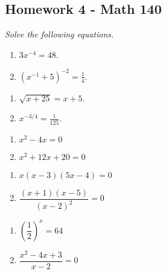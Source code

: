 \documentclass[10pt]{article}
\newcommand{\ds}{\displaystyle}
\begin{document}
\pagestyle{empty}
\subsection*{Homework 4 - Math 140}

\noindent 
\textit{Solve the following equations. }

\begin{multicols}{2}
\begin{enumerate}
\item $\ds 3 x^{-4} = 48$. 
\item $(x^{-1} + 5)^{-2} = \frac{1}{4}$. 
\setcounter{enumCount}{\theenumi}
\end{enumerate}
\end{multicols}
\vfill

\begin{multicols}{2}
\begin{enumerate}
\setcounter{enumi}{\theenumCount}
\item $\sqrt{x + 25} = x + 5$. 
\item $x^{-3/4} = \frac{1}{125}$. 
\setcounter{enumCount}{\theenumi}
\end{enumerate}
\end{multicols}
\vfill

\begin{multicols}{2}
\begin{enumerate}
\setcounter{enumi}{\theenumCount}
\item $x^2 - 4x = 0$ 
\item $x^2 + 12x + 20 = 0$
\setcounter{enumCount}{\theenumi}
\end{enumerate}
\end{multicols}
\vfill


\begin{multicols}{2}
\begin{enumerate}
\setcounter{enumi}{\theenumCount}
\item $x(x - 3)(5x-4) = 0$ 
\item $\dfrac{(x+1)(x-5)}{(x-2)^2} = 0$
\setcounter{enumCount}{\theenumi}
\end{enumerate}
\end{multicols}
\vfill


\begin{multicols}{2}
\begin{enumerate}
\setcounter{enumi}{\theenumCount}
\item $\left(\dfrac{1}{2} \right)^x = 64$ 
\item $\dfrac{x^2-4x+3}{x-2} = 0$ 
\setcounter{enumCount}{\theenumi}
\end{enumerate}
\end{multicols}
\vfill
\end{document}

